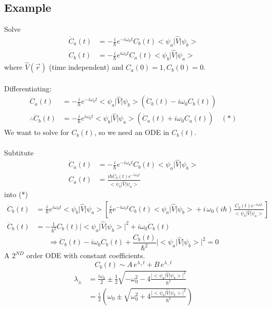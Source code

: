 \documentclass[12pt,fancychapters]{report}
\numberwithin{equation}{section}
\begin{document}
\subsection{Example}
Solve
\begin{align*}
  \dot{C}_a (t)&= -\frac{i}{\hbar}e^{-i\omega_0t}C_b(t)\big<\psi_a\big|\hat{V}\big|\psi_b\big>\\
\dot{C}_b (t)&= -\frac{i}{\hbar}e^{i\omega_0t}C_a(t)\big<\psi_b\big|\hat{V}\big|\psi_a\big>
\end{align*}
where $\hat{V}(\vec{r})$ (time independent) and $C_a(0) = 1, C_b(0) = 0$.\\
\\
Differentiating:
\begin{align*}
  \ddot{C}_a(t) &= -\frac{i}{\hbar}e^{-i\omega_0t}\big<\psi_a\big|\hat{V}\big|\psi_b\big>
  \left(\dot{C}_b(t) - i\omega_0C_b(t)\right)\\
  \therefore \ddot{C}_b(t) &= -\frac{i}{\hbar}e^{i\omega_0t}\big<\psi_b\big|\hat{V}\big|\psi_a\big>
  \left(\dot{C}_a(t) + i\omega_0C_a(t)\right)\quad (*)
\end{align*}
We want to solve for $C_b(t)$, so we need an ODE in $C_b(t)$.\\
\\
Subtitute
\begin{align*}
  \dot{C}_a(t) &=-\frac{i}{\hbar}e^{-i\omega_0t}C_b(t)\big<\psi_a\big|\hat{V}\big|\psi_b\big>\\
  C_a(t) &= \frac{i\hbar \dot{C}_b (t)e^{-i\omega_0 t}}{\big<\psi_b\big|\hat{V}\big|\psi_a\big>}
\end{align*}
into ($*$)
\begin{align*}
  \ddot{C}_b(t) &= \frac{i}{\hbar}e^{i\omega_0 t}\big<\psi_b\big|\hat{V}\big|\psi_a\big>
  \left[\frac{i}{\hbar}e^{-i\omega_0 t}C_b(t)\big<\psi_a\big|\hat{V}\big|\psi_b\big>
   + i\,\omega_0(i\hbar)\frac{\dot{C}_b(t)e^{-i\omega_0 t}}{\big<\psi_b\big|\hat{V}
\big|\psi_a\big>} \right]\\
  \ddot{C}_b(t) &= -\frac{1}{\hbar^2}C_b(t)\big|\big<\psi_a\big|\hat{V}\big|\psi_b\big>\big|^2
  + i\omega_0 \dot{C}_b(t)
\end{align*}
\[
  \Rightarrow \ddot{C}_b(t) - i\omega_0 \dot{C}_b(t)+\frac{C_b(t)}{\hbar^2}
  \big|\big<\psi_a\big|\hat{V}\big|\psi_b\big>\big|^2 = 0
\]
A $2^{ND}$ order ODE with constant coefficients.
\[
  C_b(t) \sim A\,e^{\lambda_+ t} + B\,e^{\lambda_-t}
\]
\begin{align*}
  \lambda_\pm &= \frac{i\omega_0}{2}\pm \frac{1}{2}\sqrt{-\omega_0^2 - 4\frac{\big|\big<
  \psi_a\big|\hat{V}\big|\psi_b\big>\big|^2}{\hbar^2}}\\
              &= \frac{i}{2}\left(\omega_0 \pm \sqrt{\omega_0^2 + 4\frac{\big|\big<
              \psi_a\big|\hat{V}\big|\psi_b\big>\big|^2}{\hbar^2}}\right)
\end{align*}
\end{document}
